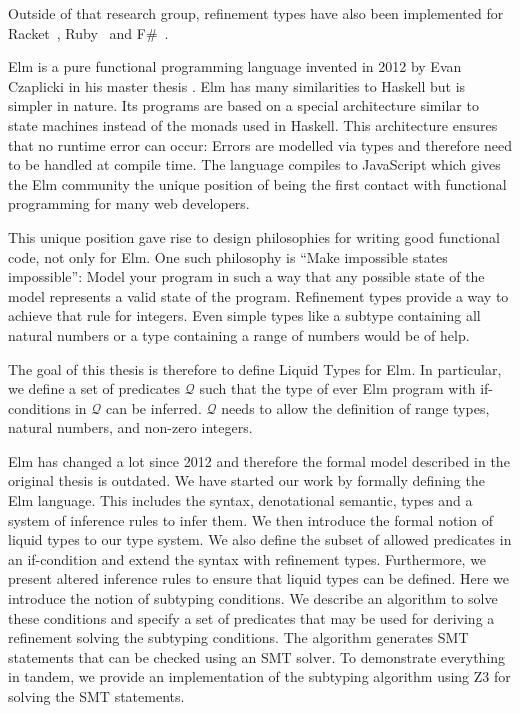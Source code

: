 \documentclass[]{scrbook}
\theoremstyle{definition}
\theoremstyle{definition}
\theoremstyle{definition}
\theoremstyle{remark}
\begin{document}
Outside of that research group, refinement types have also been
implemented for Racket~\autocite{Racket}, Ruby~\autocite{Ruby} and
F\#~\autocite{F_sharp}.

Elm is a pure functional programming language invented in 2012 by Evan
Czaplicki in his master thesis \autocite{elm}. Elm has many similarities
to Haskell but is simpler in nature. Its programs are based on a special
architecture similar to state machines instead of the monads used in
Haskell. This architecture ensures that no runtime error can occur:
Errors are modelled via types and therefore need to be handled at
compile time. The language compiles to JavaScript which gives the Elm
community the unique position of being the first contact with functional
programming for many web developers.

This unique position gave rise to design philosophies for writing good
functional code, not only for Elm. One such philosophy is
\enquote{Make impossible states impossible}: Model your program in such
a way that any possible state of the model represents a valid state of
the program. Refinement types provide a way to achieve that rule for
integers. Even simple types like a subtype containing all natural
numbers or a type containing a range of numbers would be of help.

The goal of this thesis is therefore to define Liquid Types for Elm. In
particular, we define a set of predicates \(\mathcal{Q}\) such that the
type of ever Elm program with if-conditions in \(\mathcal{Q}\) can be
inferred. \(\mathcal{Q}\) needs to allow the definition of range types,
natural numbers, and non-zero integers.

Elm has changed a lot since 2012 and therefore the formal model
described in the original thesis is outdated. We have started our work
by formally defining the Elm language. This includes the syntax,
denotational semantic, types and a system of inference rules to infer
them. We then introduce the formal notion of liquid types to our type
system. We also define the subset of allowed predicates in an
if-condition and extend the syntax with refinement types. Furthermore,
we present altered inference rules to ensure that liquid types can be
defined. Here we introduce the notion of subtyping conditions. We
describe an algorithm to solve these conditions and specify a set of
predicates that may be used for deriving a refinement solving the
subtyping conditions. The algorithm generates SMT statements that can be
checked using an SMT solver. To demonstrate everything in tandem, we
provide an implementation of the subtyping algorithm using
Z3\autocite{z3} for solving the SMT statements.
\end{document}

